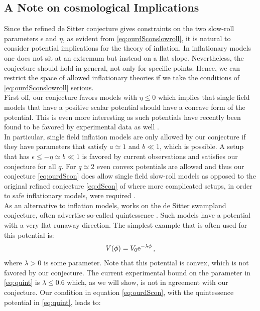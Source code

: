 \documentclass[a4paper,12pt,twoside,openright]{report}
\newcommand{\be}{\begin{equation}}
\newcommand{\ee}{\end{equation}}
\def\rme{{\rm e}}
\begin{document}
\subsection{A Note on cosmological Implications}
Since the refined de Sitter conjecture gives constraints on the two slow-roll parameters $\epsilon$ and $\eta$, as evident from \eqref{eq:ourdSconslowroll}, it is natural to consider potential implications for the theory of inflation. In inflationary models one does not sit at an extremum but instead on a flat slope. Nevertheless, the conjecture should hold in general, not only for specific points. Hence, we can restrict the space of allowed inflationary theories if we take the conditions of \eqref{eq:ourdSconslowroll} serious.\\
First off, our conjecture favors models with $\eta \leq 0$ which implies that single field models that have a positive scalar potential should have a concave form of the potential. This is even more interesting as such potentials have recently been found to be favored by experimental data as well \cite{Planck:2018jri}.\\
In particular, single field inflation models are only allowed by our conjecture if they have parameters that satisfy $a \simeq 1$ and $b \ll 1$, which is possible. A setup that has $\epsilon \leq - \eta \simeq b \ll 1 $ is favored by current observations \cite{Planck:2018jri} and satisfies our conjecture for all $q$. For $q\simeq 2$ even convex potentials are allowed and thus our conjecture \eqref{eq:ourdScon} does allow single field slow-roll models as opposed to the original refined conjecture \eqref{eq:dScon} of \cite{Ooguri:2018wrx} where more complicated setups, in order to safe inflationary models, were required \cite{Achucarro:2018vey,Kehagias:2018uem}.\\
As an alternative to inflation models, works on the de Sitter swampland conjecture, often advertise so-called quintessence \cite{Agrawal:2018own}. Such models have a potential with a very flat runaway direction. The simplest example that is often used for this potential is:
\be 
V(\phi) = V_0 \rme^ {-\lambda \phi}\,,
\label{eq:quint}
\ee
where $\lambda >0$ is some parameter. Note that this potential is convex, which is not favored by our conjecture. The current experimental bound on the parameter in \eqref{eq:quint} is $\lambda \leq 0.6$ \cite{Agrawal:2018own} which, as we will show, is not in agreement with our conjecture. Our condition in equation \eqref{eq:ourdScon}, with the quintessence potential in \eqref{eq:quint}, leads to:
\end{document}

